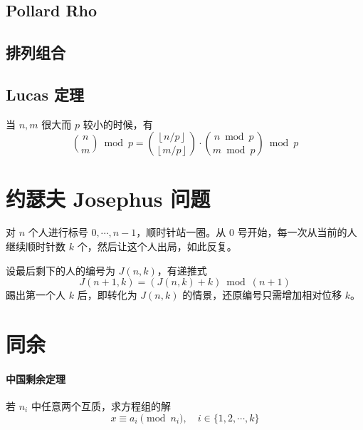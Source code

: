 \documentclass{probook}
\begin{document}
\begin{multicols}{2}


\subsection{Pollard Rho}



\subsection{排列组合}

\subsection{Lucas 定理}

当 $n,m$ 很大而 $p$ 较小的时候，有
\[  
\binom{n}{m}\bmod p = \binom{\left\lfloor n/p \right\rfloor}{\left\lfloor m/p\right\rfloor}\cdot\binom{n\bmod p}{m\bmod p}\bmod p 
\]



\section{约瑟夫 Josephus 问题}

对 $n$ 个人进行标号 $0,\cdots,n-1$，顺时针站一圈。从 $0$ 号开始，每一次从当前的人继续顺时针数 $k$ 个，然后让这个人出局，如此反复。

设最后剩下的人的编号为 $J(n,k)$，有递推式
\[J(n+1,k) = (J(n,k)+k) \bmod (n+1)\]
踢出第一个人 $k$ 后，即转化为 $J(n,k)$ 的情景，还原编号只需增加相对位移 $k$。



\section{同余}

\paragraph{中国剩余定理}
若 $n_i$ 中任意两个互质，求方程组的解
\[ x \equiv a_i \pmod {n_i} , \quad i \in \{ 1,2,\cdots,k \} \]




\end{multicols}
\end{document}
